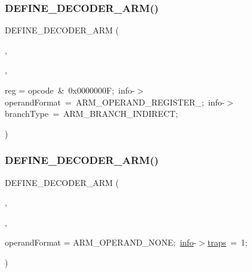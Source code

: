 \mbox{\label{decoder-arm_8c_a8c9eb8c8a847358483c2f5d1a1b69032}} 
\subsubsection{\texorpdfstring{D\+E\+F\+I\+N\+E\+\_\+\+D\+E\+C\+O\+D\+E\+R\+\_\+\+A\+R\+M()}{DEFINE\_DECODER\_ARM()}\hspace{0.1cm}{\footnotesize\ttfamily [2/6]}}
{\footnotesize\ttfamily D\+E\+F\+I\+N\+E\+\_\+\+D\+E\+C\+O\+D\+E\+R\+\_\+\+A\+RM (\begin{DoxyParamCaption}\item[{\mbox{\hyperlink{decoder-thumb_8c_aae92ee51d7cebfa199f33594fe133f31}{BX}}}]{,  }\item[{\mbox{\hyperlink{decoder-thumb_8c_aae92ee51d7cebfa199f33594fe133f31}{BX}}}]{,  }\item[{\mbox{\hyperlink{libretro_8h_a283ad41e4809f9c0ebe736a9861d8a91}{info}}-\/$>$op1.}]{reg = {\ttfamily opcode~\&~0x0000000F;~info-\/$>$operandFormat~=~ARM\+\_\+OPERAND\+\_\+REGISTER\+\_;~info-\/$>$branchType~=~ARM\+\_\+BRANCH\+\_\+INDIRECT;} }\end{DoxyParamCaption})}

\mbox{\label{decoder-arm_8c_abfe065768263133d1aca71a4b7ac42b3}} 
\subsubsection{\texorpdfstring{D\+E\+F\+I\+N\+E\+\_\+\+D\+E\+C\+O\+D\+E\+R\+\_\+\+A\+R\+M()}{DEFINE\_DECODER\_ARM()}\hspace{0.1cm}{\footnotesize\ttfamily [3/6]}}
{\footnotesize\ttfamily D\+E\+F\+I\+N\+E\+\_\+\+D\+E\+C\+O\+D\+E\+R\+\_\+\+A\+RM (\begin{DoxyParamCaption}\item[{I\+LL}]{,  }\item[{I\+LL}]{,  }\item[{\mbox{\hyperlink{libretro_8h_a283ad41e4809f9c0ebe736a9861d8a91}{info}}-\/$>$}]{operand\+Format = {\ttfamily ARM\+\_\+OPERAND\+\_\+NONE;~\mbox{\hyperlink{libretro_8h_a283ad41e4809f9c0ebe736a9861d8a91}{info}}-\/$>$\mbox{\hyperlink{decoder-thumb_8c_afe08430c255629bed908d9bf22397277}{traps}}~=~1;} }\end{DoxyParamCaption})}

